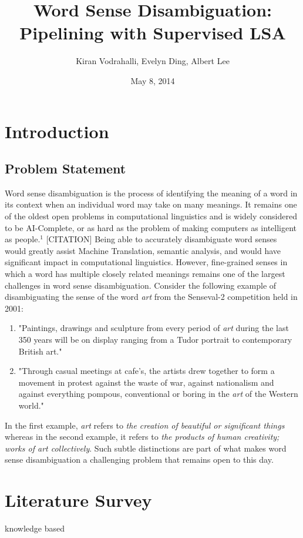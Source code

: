 \documentclass[10pt, letterpaper]{article}
\author{Kiran Vodrahalli, Evelyn Ding, Albert Lee}
\title{Word Sense Disambiguation: Pipelining with Supervised LSA}
\date{May 8, 2014}
\begin{document}
	\maketitle
	
	\section{Introduction}
	\subsection{Problem Statement}
	Word sense disambiguation is the process of identifying the meaning of a word in its context when an individual word may take on many meanings.
	It remains one of the oldest open problems in computational linguistics and is widely considered to be AI-Complete, 
	or as hard as the problem of making computers as intelligent as people.$^1$ [CITATION] Being able to accurately disambiguate word senses would greatly
	assist Machine Translation, semantic analysis, and would have significant impact in computational linguistics. However, fine-grained senses
	in which a word has multiple closely related meanings remains one of the largest challenges in word sense disambiguation. Consider the following
	example of disambiguating the sense of the word {\emph {art}} from the Senseval-2 competition held in 2001:
	\begin{enumerate}
	\item "Paintings, drawings and sculpture from every period of {\emph {art}} during the last 350 years will be on display ranging from a Tudor portrait to contemporary British art."
	\item "Through casual meetings at cafe's, the artists drew together to form a movement in protest against the waste of war, against nationalism and against everything pompous, conventional or boring in the {\emph {art}} of the Western world."
	\end{enumerate}
	In the first example, {\emph {art}} refers to {\emph {the creation of beautiful or significant things}} whereas in the second example, it refers to {\emph {the products of human creativity; works of art collectively}}. Such subtle distinctions are part of what makes word sense disambiguation a challenging problem that remains open to this day.
	\section{Literature Survey}
	knowledge based
\end{document}
